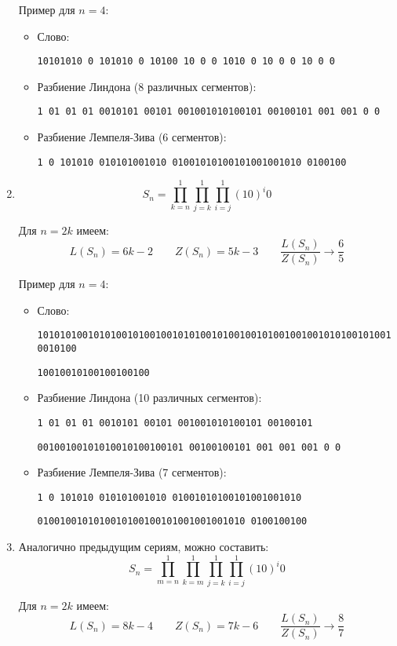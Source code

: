 \begin{enumerate}
    Пример для $ n = 4 $:
    
    \begin{itemize}
    \item
        Слово:
        
        \texttt{10101010 0 101010 0 10100 10 0  0 1010 0 10 0  0 10 0  0}
    \item
        Разбиение Линдона (8 различных сегментов):
        
        \texttt{1 01 01 01 0010101 00101 001001010100101 00100101 001 001 0 0}
    \item
        Разбиение Лемпеля-Зива (6 сегментов):
        
        \texttt{1 0 101010 010101001010 01001010100101001001010 0100100}
    \end{itemize}

\item
    $$ S_n = \prod_{k = n}^{1} \prod_{j = k}^{1} \prod_{i = j}^{1} (10)^i 0 $$
    
    Для $ n = 2 k $ имеем:
    $$ L(S_n) = 6 k - 2 \qquad Z(S_n) = 5 k - 3 \qquad \frac{L(S_n)}{Z(S_n)} \to \frac{6}{5} $$
    
    Пример для $ n = 4 $:
    
    \begin{itemize}
    \item
        Слово:
        
        \texttt{1010101001010100101001001010100101001001010010010010101001010010010100}
        
        \texttt{10010010100100100100}
    \item
        Разбиение Линдона (10 различных сегментов):
        
        \texttt{1 01 01 01 0010101 00101 001001010100101 00100101}
        
        \texttt{00100100101010010100100101 00100100101 001 001 001 0 0}
    \item
        Разбиение Лемпеля-Зива (7 сегментов):
        
        \texttt{1 0 101010 010101001010 01001010100101001001010}
        
        \texttt{0100100101010010100100101001001001010 0100100100}
    \end{itemize}
    
\item
    Аналогично предыдущим сериям, можно составить:
    $$ S_n = \prod_{m = n}^{1} \prod_{k = m}^{1} \prod_{j = k}^{1} \prod_{i = j}^{1} (10)^i 0 $$
    
    Для $ n = 2 k $ имеем:
    $$ L(S_n) = 8 k - 4 \qquad Z(S_n) = 7 k - 6 \qquad \frac{L(S_n)}{Z(S_n)} \to \frac{8}{7} $$

\end{enumerate}
